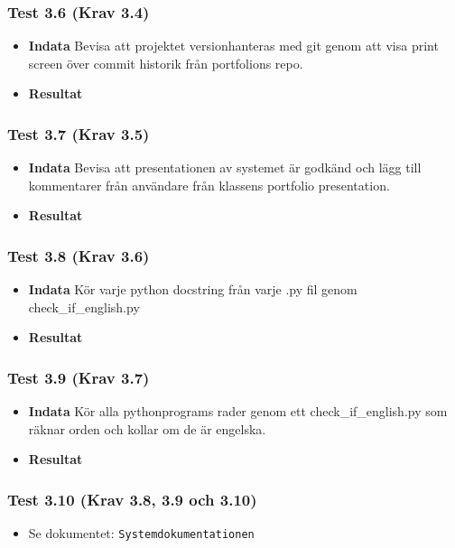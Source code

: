 \documentclass{TDP003mall}
\begin{document}
\subsubsection*{Test 3.6 (Krav 3.4)}
\begin{itemize}
\item[]\textbf{Indata} Bevisa att projektet versionhanteras med git genom att visa print screen över commit historik från portfolions repo.
\item[]\textbf{Resultat} 
\end{itemize}
\subsubsection*{Test 3.7 (Krav 3.5)}
\begin{itemize}
\item[]\textbf{Indata} Bevisa att presentationen av systemet är godkänd och lägg till kommentarer från användare från klassens portfolio presentation.
\item[]\textbf{Resultat} 
\end{itemize}
\subsubsection*{Test 3.8 (Krav 3.6)}
\begin{itemize}
\item[]\textbf{Indata} Kör varje python docstring från varje .py fil genom check\_if\_english.py
\item[]\textbf{Resultat} 
\end{itemize}
\subsubsection*{Test 3.9 (Krav 3.7)}
\begin{itemize}
\item[]\textbf{Indata} Kör alla pythonprograms rader genom ett check\_if\_english.py som räknar orden och kollar om de är engelska. 
\item[]\textbf{Resultat} 
\end{itemize}
\subsubsection*{Test 3.10 (Krav 3.8, 3.9 och 3.10)}
\begin{itemize}
\item[] Se dokumentet: \texttt{Systemdokumentationen}
\end{itemize}
\end{document}
